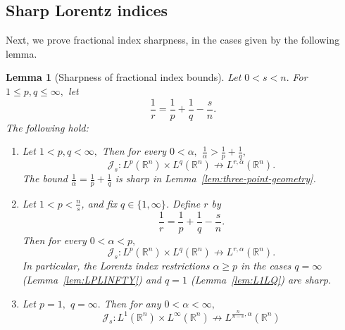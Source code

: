 \documentclass[12pt]{article}
\newtheorem{lemma}[theorem]{Lemma}
\theoremstyle{definition}
\theoremstyle{remark}
\numberwithin{equation}{section}
\begin{document}
\subsection{Sharp Lorentz indices}
Next, we prove fractional index sharpness, in the cases given by the following lemma.

\begin{lemma}[Sharpness of fractional index bounds] 
Let $0<s<n.$ For $1\leq p,q\leq \infty,$ let 
\begin{equation}\frac{1}{r}=\frac{1}{p}+\frac{1}{q}-\frac{s}{n}.\end{equation}
The following hold: 
\begin{enumerate}
    \item \label{item:bessel-inside} Let $1<p,q<\infty, $ 
    Then for every $0<\alpha,$ $\frac{1}{\alpha}>\frac{1}{p}+\frac{1}{q},$ 
    \[
    \mathcal{J}_s:L^p(\mathbb{R}^n)\times L^q(\mathbb{R}^n)\not\to L^{r,\alpha}(\mathbb{R}^n).
    \]
    The bound $\frac{1}{\alpha}=\frac{1}{p}+\frac{1}{q}$ is sharp in Lemma~\ref{lem:three-point-geometry}.
    \item \label{item:bessel-endpoints} Let $1<p<\frac{n}{s}$, and fix $q\in\{1,\infty\}$. Define $r$ by
    \begin{equation*}\label{eq:r-def-bessel}
    \frac{1}{r}=\frac1p+\frac1q-\frac{s}{n}.
    \end{equation*}
    Then for every $0<\alpha<p,$ 
    \[
    \mathcal J_s:L^p(\mathbb{R}^n)\times L^q(\mathbb{R}^n)\not\to L^{r,\alpha}(\mathbb R^n).
    \]
    In particular, the Lorentz index restrictions $\alpha\ge p$ in the cases
    $q=\infty$ (Lemma~\ref{lem:LPLINFTY}) and $q=1$ (Lemma~\ref{lem:L1LQ}) are sharp.
    \item \label{item:bessel-enpoint-bi} Let $p=1,$ $q=\infty.$ Then for any $0<\alpha<\infty,$
    \[
    \mathcal J_s:L^1(\mathbb{R}^n)\times L^\infty(\mathbb{R}^n)\not\to L^{\frac{n}{n-s},\alpha}(\mathbb R^n)
    \]
\end{enumerate}

\end{lemma}
\end{document}
